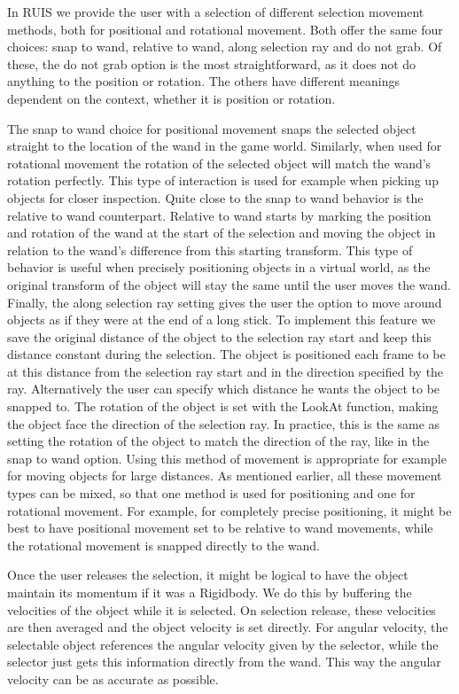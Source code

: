 \documentclass[12pt,a4paper,oneside,pdftex]{report}
\begin{document}
In RUIS we provide the user with a selection of different selection movement methods, both for positional and rotational movement. Both offer the same four choices: snap to wand, relative to wand, along selection ray and do not grab. Of these, the do not grab option is the most straightforward, as it does not do anything to the position or rotation. The others have different meanings dependent on the context, whether it is position or rotation.

The snap to wand choice for positional movement snaps the selected object straight to the location of the wand in the game world. Similarly, when used for rotational movement the rotation of the selected object will match the wand's rotation perfectly. This type of interaction is used for example when picking up objects for closer inspection. Quite close to the snap to wand behavior is the relative to wand counterpart. Relative to wand starts by marking the position and rotation of the wand at the start of the selection and moving the object in relation to the wand's difference from this starting transform. This type of behavior is useful when precisely positioning objects in a virtual world, as the original transform of the object will stay the same until the user moves the wand. Finally, the along selection ray setting gives the user the option to move around objects as if they were at the end of a long stick. To implement this feature we save the original distance of the object to the selection ray start and keep this distance constant during the selection. The object is positioned each frame to be at this distance from the selection ray start and in the direction specified by the ray. Alternatively the user can specify which distance he wants the object to be snapped to. The rotation of the object is set with the LookAt function, making the object face the direction of the selection ray. In practice, this is the same as setting the rotation of the object to match the direction of the ray, like in the snap to wand option. Using this method of movement is appropriate for example for moving objects for large distances. As mentioned earlier, all these movement types can be mixed, so that one method is used for positioning and one for rotational movement. For example, for completely precise positioning, it might be best to have positional movement set to be relative to wand movements, while the rotational movement is snapped directly to the wand.

Once the user releases the selection, it might be logical to have the object maintain its momentum if it was a Rigidbody. We do this by buffering the velocities of the object while it is selected. On selection release, these velocities are then averaged and the object velocity is set directly. For angular velocity, the selectable object references the angular velocity given by the selector, while the selector just gets this information directly from the wand. This way the angular velocity can be as accurate as possible.
\end{document}
